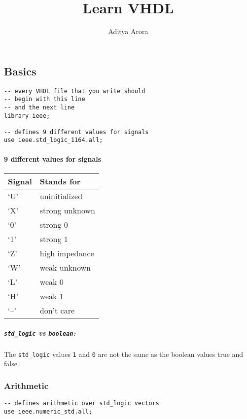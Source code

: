 \documentclass[
]{article}
\title{Learn VHDL}
\author{Aditya Arora}
\date{}
\begin{document}
\maketitle

{
\setcounter{tocdepth}{6}
\tableofcontents
}
\hfill\break

\hypertarget{basics}{%
\subsection{Basics}\label{basics}}

\begin{verbatim}
-- every VHDL file that you write should
-- begin with this line
-- and the next line
library ieee;

-- defines 9 different values for signals
use ieee.std_logic_1164.all;
\end{verbatim}

\hypertarget{different-values-for-signals}{%
\paragraph{9 different values for signals}\label{different-values-for-signals}}

\begin{longtable}[]{@{}ll@{}}
\toprule
Signal & Stands for\tabularnewline
\midrule
\endhead
`U' & uninitialized\tabularnewline
`X' & strong unknown\tabularnewline
`0' & strong 0\tabularnewline
`1' & strong 1\tabularnewline
`Z' & high impedance\tabularnewline
`W' & weak unknown\tabularnewline
`L' & weak 0\tabularnewline
`H' & weak 1\tabularnewline
`--' & don't care\tabularnewline
\bottomrule
\end{longtable}

\hypertarget{std_logic-vs-boolean}{%
\subparagraph{\texorpdfstring{\texttt{std\_logic} vs \texttt{boolean}:}{std\_logic vs boolean:}}\label{std_logic-vs-boolean}}

The \texttt{std\_logic} values \texttt{\textquotesingle{}1\textquotesingle{}} and \texttt{\textquotesingle{}0\textquotesingle{}} are not the same as the boolean values true and false.

\hypertarget{arithmetic}{%
\subsubsection{Arithmetic}\label{arithmetic}}

\begin{verbatim}
-- defines arithmetic over std_logic vectors
use ieee.numeric_std.all;
\end{verbatim}
\end{document}
